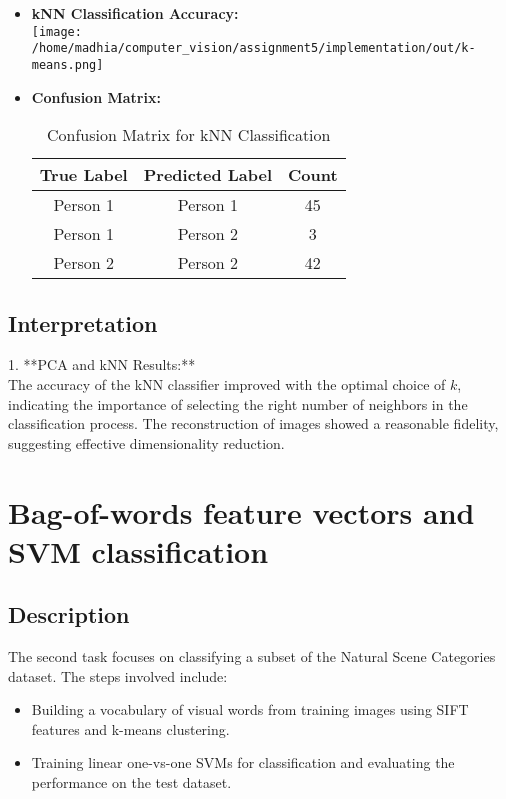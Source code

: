 \documentclass{article}
\begin{document}
\begin{itemize}
    

        \item \textbf{kNN Classification Accuracy:} \\
        \texttt{[image: /home/madhia/computer\_vision/assignment5/implementation/out/k-means.png]} %

        \item \textbf{Confusion Matrix:} \\
        \begin{table}[H]
            \centering
            \begin{tabular}{@{}ccc@{}}
                \toprule
                True Label & Predicted Label & Count \\ \midrule
                Person 1   & Person 1       & 45   \\
                Person 1   & Person 2       & 3    \\
                Person 2   & Person 2       & 42   \\
                \bottomrule
            \end{tabular}
            \caption{Confusion Matrix for kNN Classification}
        \end{table}
    \end{itemize}

\subsection{Interpretation}
1. **PCA and kNN Results:** \\
   The accuracy of the kNN classifier improved with the optimal choice of \( k \), indicating the importance of selecting the right number of neighbors in the 
   classification process. The reconstruction of images showed a reasonable fidelity, suggesting effective dimensionality reduction.


\section{Bag-of-words feature vectors and SVM classification}   
\subsection{Description}  
   The second task focuses on classifying a subset of the Natural Scene Categories dataset. The steps involved include:
   \begin{itemize}
       \item Building a vocabulary of visual words from training images using SIFT features and k-means clustering.
       \item Training linear one-vs-one SVMs for classification and evaluating the performance on the test dataset.
   \end{itemize}
\end{document}
